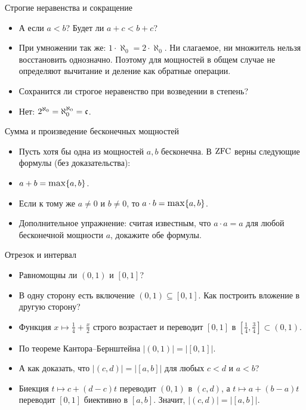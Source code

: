 \documentclass[10pt]{beamer}
\begin{document}
\begin{frame}{Строгие неравенства и сокращение}
    \begin{itemize}
        \item А если $a<b$? Будет ли $a+c<b+c$? 
        \item<3-> При умножении так же: $1\cdot\aleph_0=2\cdot\aleph_0$. Ни слагаемое, ни множитель нельзя восстановить однозначно. Поэтому для мощностей в общем случае не определяют вычитание и деление как обратные операции.
        \item<4-> Сохранится ли строгое неравенство при возведении в степень?
        \item<5-> Нет: $2^{\aleph_0}=\aleph_0^{\aleph_0}=\mathfrak{c}$.
    \end{itemize}
\end{frame}

\begin{frame}{Сумма и произведение бесконечных мощностей}
    \newcommand{\cardmax}{\mathop{\scalebox{1.12}{$\max$}}\nolimits}
    \begin{itemize}
        \item Пусть хотя бы одна из мощностей $a,b$ бесконечна. В $\mathrm{ZFC}$ верны следующие формулы (без доказательства):
        \item $a+b=\cardmax\{a,b\}$.
        \item<2-> Если к тому же $a\ne0$ и $b\ne0$, то $a\cdot b=\cardmax\{a,b\}$.
        \item<3-> Дополнительное упражнение: считая известным, что $a\cdot a=a$ для любой бесконечной мощности $a$, докажите обе формулы.
    \end{itemize}
\end{frame}

\begin{frame}{Отрезок и интервал}
    \begin{itemize}
        \item Равномощны ли $(0,1)$ и $[0,1]$?
        \item<2-> В одну сторону есть включение $(0,1)\subseteq[0,1]$. Как построить вложение в другую сторону?
        \item<3-> Функция $x\mapsto\frac14+\frac{x}{2}$ строго возрастает и переводит $[0,1]$ в $[\frac14,\frac34]\subset(0,1)$.
        \item<4-> По теореме Кантора--Бернштейна $|(0,1)|=|[0,1]|$.
        \item<5-> А как доказать, что $|(c,d)|=|[a,b]|$ для любых $c<d$ и $a<b$?
        \item<6-> Биекция $t\mapsto c+(d-c)t$ переводит $(0,1)$ в $(c,d)$, а $t\mapsto a+(b-a)t$ переводит $[0,1]$ биективно в $[a,b]$. Значит, $|(c,d)|=|[a,b]|$.
    \end{itemize}
\end{frame}
\end{document}
